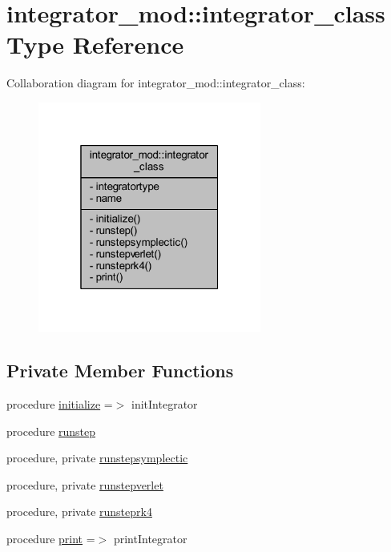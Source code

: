 \hypertarget{structintegrator__mod_1_1integrator__class}{}\section{integrator\+\_\+mod\+:\+:integrator\+\_\+class Type Reference}
\label{structintegrator__mod_1_1integrator__class}


Collaboration diagram for integrator\+\_\+mod\+:\+:integrator\+\_\+class\+:\nopagebreak
\begin{figure}[H]
\begin{center}
\leavevmode
\includegraphics[width=208pt]{structintegrator__mod_1_1integrator__class__coll__graph}
\end{center}
\end{figure}
\subsection*{Private Member Functions}
\begin{DoxyCompactItemize}
\item 
procedure \mbox{\hyperlink{structintegrator__mod_1_1integrator__class_a1becdc8a710c8f765e967600f51b5401}{initialize}} =$>$ init\+Integrator
\item 
procedure \mbox{\hyperlink{structintegrator__mod_1_1integrator__class_a5d9a1fd29f148e93626f4025bb67a89c}{runstep}}
\item 
procedure, private \mbox{\hyperlink{structintegrator__mod_1_1integrator__class_a47a8eecf5333b28f07de1d9899b8aadf}{runstepsymplectic}}
\item 
procedure, private \mbox{\hyperlink{structintegrator__mod_1_1integrator__class_ab67d78bd1f6db450d70c777170a00393}{runstepverlet}}
\item 
procedure, private \mbox{\hyperlink{structintegrator__mod_1_1integrator__class_a891645da685e5e7233eb5af39d8337d6}{runsteprk4}}
\item 
procedure \mbox{\hyperlink{structintegrator__mod_1_1integrator__class_a273b234287305719bf5ba82305b0b5d8}{print}} =$>$ print\+Integrator
\end{DoxyCompactItemize}
